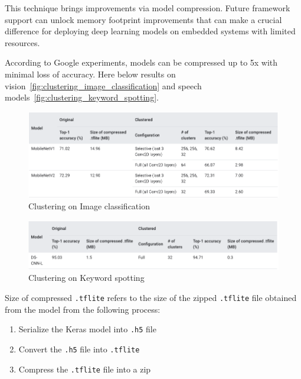 This technique brings improvements via model compression. Future framework
support can unlock memory footprint improvements that can make a crucial
difference for deploying deep learning models on embedded systems with limited
resources.

According to Google experiments, models can be compressed up to 5x with minimal
loss of accuracy. Here below results on
vision~\autoref{fig:clustering_image_classification} and speech
models~\autoref{fig:clustering_keyword_spotting}.

\begin{figure}[ht]
    \includegraphics[width=\textwidth]{images/introduction/clustering_image_classification.png}
    \centering
    \caption{Clustering on Image classification}\label{fig:clustering_image_classification}
\end{figure}


\begin{figure}[ht]
    \includegraphics[width=\textwidth]{images/introduction/clustering_keyword_spotting.png}
    \centering
    \caption{Clustering on Keyword spotting}\label{fig:clustering_keyword_spotting}
\end{figure}

Size of compressed \texttt{.tflite} refers to the size of the zipped
\texttt{.tflite} file obtained from the model from the following process:

\begin{enumerate}
    \item Serialize the Keras model into \texttt{.h5} file
    \item Convert the \texttt{.h5} file into \texttt{.tflite}
    \item Compress the \texttt{.tflite} file into a zip
\end{enumerate}

